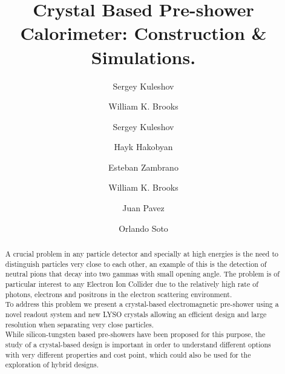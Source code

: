 \documentclass[final,5p,times,twocolumn]{elsarticle}
\begin{document}
%
\begin{frontmatter}
%
%
%
\title{Crystal Based Pre-shower Calorimeter: Construction \& Simulations.}
%
%
\author[A]{Sergey Kuleshov} 
\author[A]{William K. Brooks}
\author[A]{Sergey Kuleshov}
\author[A]{Hayk Hakobyan}	
\author[A]{Esteban Zambrano}
\author[A]{William K. Brooks}
\author[A]{Juan Pavez}
\author[A]{Orlando Soto}
\address[A]{Universidad T\'ecnica Federico Santa Mar\'ia, Valpara\'iso, Chile}
%
\begin{abstract}
A crucial problem in any particle detector and specially at high energies is the need to distinguish particles very close to each other, an example of this is the detection of neutral pions that decay into two gammas with small opening angle. The problem is of particular interest to any Electron Ion Collider due to the relatively high rate of photons, electrons and positrons in the electron scattering environment.\\

To address this problem we present a crystal-based electromagnetic pre-shower using a novel readout system and new LYSO crystals allowing an efficient design and large resolution when separating very close particles. \\

While silicon-tungsten based pre-showers have been proposed for this purpose, the study of a crystal-based design is important in order to understand different options with very different properties and cost point, which could also be used for the exploration of hybrid designs. 


\end{abstract}
\end{frontmatter}
\end{document}
